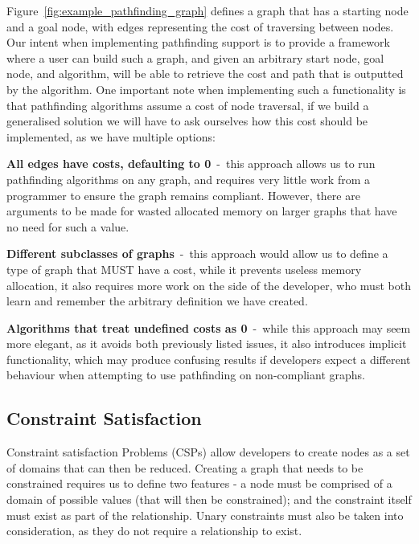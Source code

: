 Figure~\ref{fig:example_pathfinding_graph} defines a graph that has a starting node and a goal node, with edges
representing the cost of traversing between nodes.
Our intent when implementing pathfinding support is to provide a framework where a user can build such a graph, and
given an arbitrary start node, goal node, and algorithm, will be able to retrieve the cost and path that is outputted by
the algorithm.
One important note when implementing such a functionality is that pathfinding algorithms assume a cost of node
traversal, if we build a generalised solution we will have to ask ourselves how this cost should be implemented, as we
have multiple options:

\textbf{All edges have costs, defaulting to 0}~-~this approach allows us to run pathfinding algorithms on any graph, and
requires very little work from a programmer to ensure the graph remains compliant.
However, there are arguments to be made for wasted allocated memory on larger graphs that have no need for such a value.

\textbf{Different subclasses of graphs}~-~this approach would allow us to define a type of graph that MUST have a cost,
while it prevents useless memory allocation, it also requires more work on the side of the developer, who must both
learn and remember the arbitrary definition we have created.

\textbf{Algorithms that treat undefined costs as 0}~-~while this approach may seem more elegant, as it avoids both
previously listed issues, it also introduces implicit functionality, which may produce confusing results if developers
expect a different behaviour when attempting to use pathfinding on non-compliant graphs.

\subsection{Constraint Satisfaction}\label{subsec:constraint-satisfaction}
Constraint satisfaction Problems (CSPs) allow developers to create nodes as a set of domains that can then be reduced.
Creating a graph that needs to be constrained requires us to define two features - a node must be comprised of a domain
of possible values (that will then be constrained); and the constraint itself must exist as part of the relationship.
Unary constraints must also be taken into consideration, as they do not require a relationship to exist.

